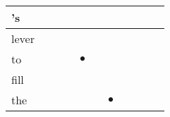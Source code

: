 \documentclass[landscape]{article}
\newcommand{\ssp}{\hspace{2pt}}
\newcommand{\mex}{\cellcolor{g}$\bullet$}
\begin{document}
\begin{tabular}{|l|p{10pt}|p{10pt}|p{10pt}|p{10pt}|p{10pt}|p{10pt}|p{10pt}|p{10pt}|p{10pt}|p{10pt}|}
\hline
\ssp 's \ssp&\hspace{2pt}&\hspace{2pt}&\hspace{2pt}&\hspace{2pt}&\hspace{2pt}&\hspace{2pt}&\hspace{2pt}&\hspace{2pt}&\hspace{2pt}&\hspace{2pt}\\
\hline
\ssp lever \ssp&\hspace{2pt}&\hspace{2pt}&\hspace{2pt}&\hspace{2pt}&\hspace{2pt}&\hspace{2pt}&\hspace{2pt}&\hspace{2pt}&\hspace{2pt}&\hspace{2pt}\\
\hline
\ssp \cellcolor{ref3}to \ssp&\hspace{2pt}&\hspace{2pt}&\hspace{2pt}&\hspace{2pt}\mex&\hspace{2pt}&\hspace{2pt}&\hspace{2pt}&\hspace{2pt}&\hspace{2pt}&\hspace{2pt}\\
\hline
\ssp fill \ssp&\hspace{2pt}&\hspace{2pt}&\hspace{2pt}&\hspace{2pt}&\hspace{2pt}&\hspace{2pt}&\hspace{2pt}&\hspace{2pt}&\hspace{2pt}&\hspace{2pt}\\
\hline
\ssp \cellcolor{ref5}the \ssp&\hspace{2pt}&\hspace{2pt}&\hspace{2pt}&\hspace{2pt}&\hspace{2pt}&\hspace{2pt}\mex&\hspace{2pt}&\hspace{2pt}&\hspace{2pt}&\hspace{2pt}\\

\end{tabular}
\end{document}
